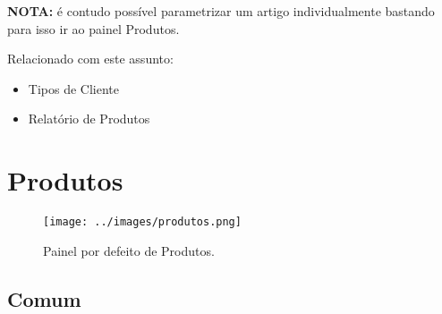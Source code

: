 \documentclass[a4paper,11pt,openany]{memoir}
\begin{document}
\textbf{NOTA:} é contudo possível parametrizar um artigo individualmente bastando para isso ir ao painel
Produtos.

Relacionado com este assunto:
\begin{itemize}
\item Tipos de Cliente
\item Relatório de Produtos
\end{itemize}

\section{Produtos}

\begin{figure}
\texttt{[image: ../images/produtos.png]}
\caption[Submanifold]{Painel por defeito de Produtos.}
\end{figure}

\subsection{Comum}
\end{document}
